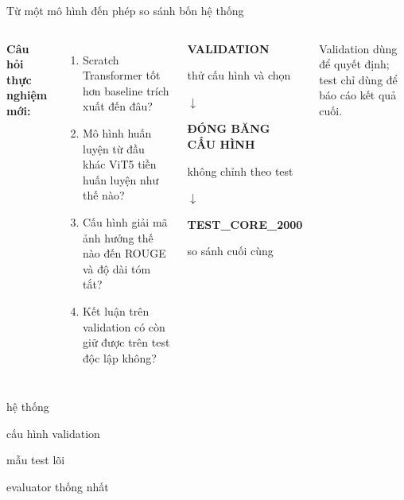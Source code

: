 \documentclass[aspectratio=169,10pt]{beamer}
\newcommand{\metric}[2]{%
  \begin{minipage}[t]{0.23\linewidth}
    \centering{\color{DeepBlue}\Large\bfseries #1}\par
    {\scriptsize #2}
  \end{minipage}%
}
\begin{document}
\begin{frame}{Từ một mô hình đến phép so sánh bốn hệ thống}
  \begin{columns}[T,onlytextwidth]
      \textbf{Câu hỏi thực nghiệm mới:}
      \begin{enumerate}
        \small\setlength{\itemsep}{5pt}
        \item Scratch Transformer tốt hơn baseline trích xuất đến đâu?
        \item Mô hình huấn luyện từ đầu khác ViT5 tiền huấn luyện như thế nào?
        \item Cấu hình giải mã ảnh hưởng thế nào đến ROUGE và độ dài tóm tắt?
        \item Kết luận trên validation có còn giữ được trên test độc lập không?
      \end{enumerate}
      \begin{softbox}
        \centering\small
        \textbf{VALIDATION}\par
        thử cấu hình và chọn\par
        $\downarrow$\par
        \textbf{ĐÓNG BĂNG CẤU HÌNH}\par
        không chỉnh theo test\par
        $\downarrow$\par
        \textbf{TEST\_CORE\_2000}\par
        so sánh cuối cùng
      \end{softbox}
      \vspace{2mm}
      \begin{keymessage}
        \scriptsize Validation dùng để quyết định; test chỉ dùng để báo cáo kết quả cuối.
      \end{keymessage}
  \end{columns}
  \vspace{0.18cm}
  \metric{4}{hệ thống}\hfill
  \metric{9}{cấu hình validation}\hfill
  \metric{2.000}{mẫu test lõi}\hfill
  \metric{1}{evaluator thống nhất}
\end{frame}
\end{document}
